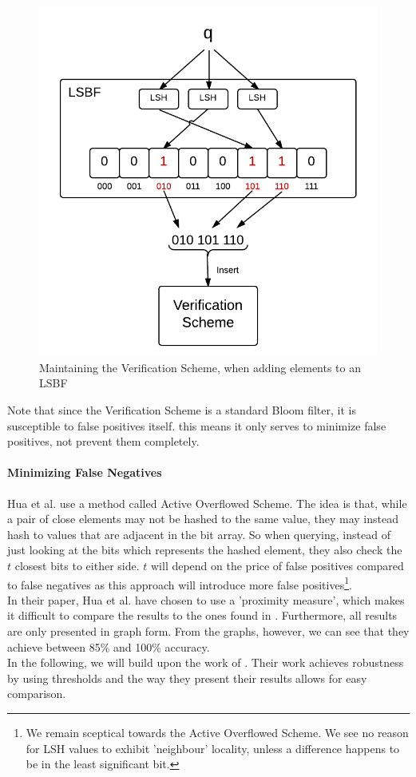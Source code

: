 \documentclass[a4paper,11pt]{article}
\begin{document}
\begin{figure}[H]
\centering
\includegraphics[width=.5\linewidth]{verification_scheme}
\caption{Maintaining the Verification Scheme, when adding elements to an LSBF}
\label{fig:verification_scheme}
\end{figure}

Note that since the Verification Scheme is a standard Bloom filter, it is susceptible to false positives itself. this means it only serves to minimize false positives, not prevent them completely.

\paragraph{Minimizing False Negatives}
Hua et al. use a method called Active Overflowed Scheme. The idea is that, while a pair of close elements may not be hashed to the same value, they may instead hash to values that are adjacent in the bit array. So when querying, instead of just looking at the bits which represents the hashed element, they also check the $t$ closest bits to either side. $t$ will depend on the price of false positives compared to false negatives as this approach will introduce more false positives\footnote{We remain sceptical towards the Active Overflowed Scheme. We see no reason for LSH values to exhibit 'neighbour' locality, unless a difference happens to be in the least significant bit.
}.\\

In their paper, Hua et al. have chosen to use a 'proximity measure', which makes it difficult to compare the results to the ones found in \cite{paper:harvard}. Furthermore, all results are only presented in graph form. From the graphs, however, we can see that they achieve between 85\% and 100\% accuracy.\\


In the following, we will build upon the work of \cite{paper:harvard}.  Their work achieves robustness by using thresholds and the way they present their results allows for easy comparison.\\
\end{document}
